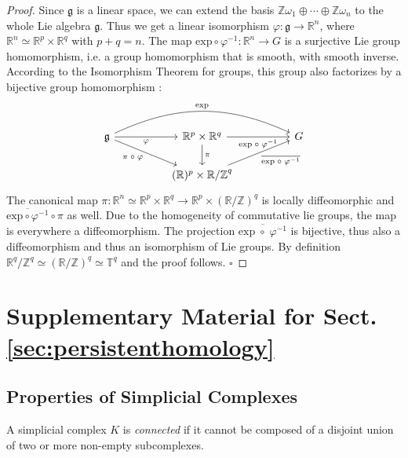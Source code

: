 \documentclass[envcountsect,runningheads]{llncs}
\renewcommand{\qed}{\hfill$\square$}
\begin{document}
\begin{proof}
Since $\mathfrak{g}$ is a linear space, we can extend the basis $\mathbb{Z}\omega_1 \oplus \cdots \oplus \mathbb{Z} \omega_n$ to the whole Lie algebra $\mathfrak{g}$. Thus we get a linear isomorphism $\varphi: \mathfrak{g} \rightarrow \mathbb{R}^n$, where $\mathbb{R}^n \simeq \mathbb{R}^p \times \mathbb{R}^q$ with $p+q = n$. The map $\text{exp} \circ \varphi^{-1}: \mathbb{R}^n \rightarrow G$ is a surjective Lie group homomorphism, i.e. a group homomorphism that is smooth, with smooth inverse. According to the Isomorphism Theorem for groups, this group also factorizes by a bijective group homomorphism \cite[pp.~5-7]{van2003lie}:
\[
\begin{tikzcd}[column sep=huge]
    \displaystyle \mathfrak{g}
    \arrow[swap]{r}{\varphi}
    \arrow[bend left=25]{rr}{\text{exp}}
    \arrow[swap]{dr}{\pi \; \circ \; \varphi}
&   \mathbb{R}^p \times \mathbb{R}^q
    \arrow{d}{\pi}
    \arrow[swap]{r}{\text{exp} \; \circ \; \varphi^{-1}}
&   G\\	
&   (\mathbb{R})^p \times \mathbb{R/\mathbb{Z}}^q 
	\arrow[swap]{ur}{\overline{\text{exp} \; \circ \; \varphi^{-1}}}
\end{tikzcd}
\]
The canonical map $\pi: \mathbb{R}^n \simeq \mathbb{R}^p \times \mathbb{R}^q \rightarrow \mathbb{R}^p \times (\mathbb{R}/\mathbb{Z})^q$ is locally diffeomorphic and $\overline{\text{exp} \circ \varphi^{-1}} \circ \pi$ as well. Due to the homogeneity of commutative lie groups, the map is everywhere a diffeomorphism. The projection $\overline{\text{exp} \; \circ \; \varphi^{-1}}$ is bijective, thus also a diffeomorphism and thus an isomorphism of Lie groups. By definition $\mathbb{R}^q/\mathbb{Z}^q \simeq (\mathbb{R}/\mathbb{Z})^q \simeq \mathbb{T}^q$ and the proof follows. \qed
\end{proof}

\section{Supplementary Material for Sect. \ref{sec:persistenthomology}}
\label{persistenthomologyproofs}
\subsection{Properties of Simplicial Complexes}
\begin{definition}
A simplicial complex $K$ is \textit{connected} if it cannot be composed of a disjoint union of two or more non-empty subcomplexes.
\end{definition}
\end{document}
